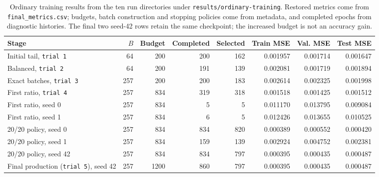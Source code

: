 \begin{table}[h!]
    \centering
    \begin{tabularx}{\linewidth}{@{}Xrrrrrrr@{}}
        \hline
        Stage & $B$ & Budget & Completed & Selected & Train MSE & Val. MSE & Test MSE \\
        \hline
        Initial tail, \texttt{trial 1} & 64 & 200 & 200 & 162 & 0.001957 & 0.001714 & 0.001647 \\
        Balanced, \texttt{trial 2} & 64 & 200 & 191 & 139 & 0.002081 & 0.001719 & 0.001894 \\
        Exact batches, \texttt{trial 3} & 257 & 200 & 200 & 183 & 0.002614 & 0.002325 & 0.001998 \\
        First ratio, \texttt{trial 4} & 257 & 834 & 319 & 318 & 0.001518 & 0.001425 & 0.001512 \\
        First ratio, seed 0 & 257 & 834 & 5 & 5 & 0.011170 & 0.013795 & 0.009084 \\
        First ratio, seed 1 & 257 & 834 & 6 & 5 & 0.012426 & 0.013655 & 0.010525 \\
        20/20 policy, seed 0 & 257 & 834 & 834 & 820 & 0.000389 & 0.000552 & 0.000420 \\
        20/20 policy, seed 1 & 257 & 834 & 159 & 139 & 0.002924 & 0.004752 & 0.002381 \\
        20/20 policy, seed 42 & 257 & 834 & 834 & 797 & 0.000395 & 0.000435 & 0.000487 \\
        Final production (\texttt{trial 5}), seed 42 & 257 & 1200 & 860 & 797 & 0.000395 & 0.000435 & 0.000487 \\
        \hline
    \end{tabularx}
    \caption{Ordinary training results from the ten run directories under \texttt{results/ordinary-training}. Restored metrics come from \texttt{final\_metrics.csv}; budgets, batch construction and stopping policies come from metadata, and completed epochs from diagnostic histories. The final two seed-42 rows retain the same checkpoint; the increased budget is not an accuracy gain.}
    \label{tab:04_final_training_trials}
\end{table}


